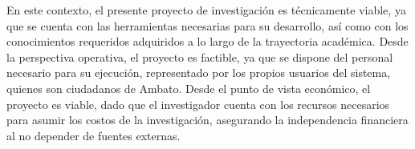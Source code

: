 \bigbreak
En este contexto, el presente proyecto de investigación es técnicamente viable, ya que se cuenta con las
herramientas necesarias para su desarrollo, así como con los conocimientos requeridos adquiridos a lo largo
de la trayectoria académica. Desde la perspectiva operativa, el proyecto es factible, ya que se dispone del
personal necesario para su ejecución, representado por los propios usuarios del sistema, quienes son ciudadanos
de Ambato. Desde el punto de vista económico, el proyecto es viable, dado que el investigador cuenta con los
recursos necesarios para asumir los costos de la investigación, asegurando la independencia financiera al
no depender de fuentes externas.